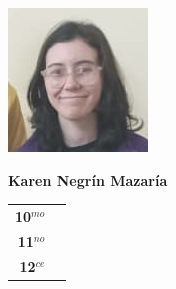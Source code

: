 \begin{minipage}{0.2\textwidth}
	\includegraphics[width=\linewidth]{img/concursantes/karen.png} %
\end{minipage}
\hfill
\begin{minipage}{0.7\textwidth}
	\textbf{Karen Negrín Mazaría}
	
	\vspace*{0.1in}
	\begin{tabular}{rl}
		
		\textbf{10$^{mo}$} &   \\
		
		\textbf{11$^{no}$} &  \\
		
		\textbf{12$^{ce}$} &   \\
		
		
	\end{tabular}
\end{minipage}



